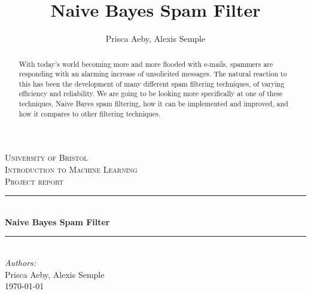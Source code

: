 \documentclass[12pt,a4paper]{report}
\author{Prisca Aeby, Alexis Semple}
\title{Naive Bayes Spam Filter}
\begin{document}
\begin{titlepage}

\newcommand{\HRule}{\rule{\linewidth}{0.5mm}} %

\center %
 

\textsc{\LARGE University of Bristol}\\[1.5cm] %
\textsc{\LARGE Introduction to Machine Learning}\\[1cm] %
\textsc{\Large Project report}\\[1cm]


\HRule \\[0.4cm]
{\huge \bfseries Naive Bayes Spam Filter}\\[0.4cm] %
\HRule \\[1.5cm]
 

\Large \emph{Authors:}\\
Prisca Aeby, Alexis Semple\\[3cm] %


{\large \today}\\[3cm] %

\vfill %

\end{titlepage}

\begin{abstract}
With today's world becoming more and more flooded with e-mails, spammers are responding with an alarming increase of unsolicited messages. The natural reaction to this has been the development of many different spam filtering techniques, of varying efficiency and reliability. We are going to be looking more specifically at one of these techniques, Naive Bayes spam filtering, how it can be implemented and improved, and how it compares to other filtering techniques.
\end{abstract}
\end{document}
